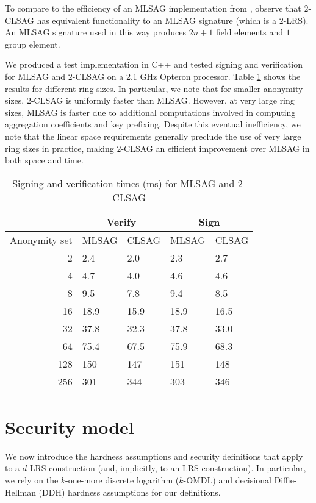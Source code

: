 \documentclass[draft]{llncs} %
\begin{document}
To compare to the efficiency of an MLSAG implementation from \cite{noether}, observe that $2$-CLSAG has equivalent functionality to an MLSAG signature (which is a $2$-LRS). An MLSAG signature used in this way produces $2n+1$ field elements and $1$ group element.

We produced a test implementation in C++ and tested signing and verification for MLSAG and $2$-CLSAG on a 2.1 GHz Opteron processor. Table \ref{table:timing} shows the results for different ring sizes. In particular, we note that for smaller anonymity sizes, $2$-CLSAG is uniformly faster than MLSAG. However, at very large ring sizes, MLSAG is faster due to additional computations involved in computing aggregation coefficients and key prefixing. Despite this eventual inefficiency, we note that the linear space requirements generally preclude the use of very large ring sizes in practice, making $2$-CLSAG an efficient improvement over MLSAG in both space and time.

\begin{table}[htp]
\begin{center}
\begin{tabular}{r|ll|ll}
& \multicolumn{2}{c|}{Verify} & \multicolumn{2}{c}{Sign} \\
\hline
Anonymity set & MLSAG & CLSAG & MLSAG & CLSAG \\
\hline
2 & 2.4 & 2.0 & 2.3 & 2.7 \\
4 & 4.7 & 4.0 & 4.6 & 4.6 \\
8 & 9.5 & 7.8 & 9.4 & 8.5 \\
16 & 18.9 & 15.9 & 18.9 & 16.5 \\
32 & 37.8 & 32.3 & 37.8 & 33.0 \\
64 & 75.4 & 67.5 & 75.9 & 68.3 \\
128 & 150 & 147 & 151 & 148 \\
256 & 301 & 344 & 303 & 346
\end{tabular}
\end{center}
\caption{Signing and verification times (ms) for MLSAG and $2$-CLSAG}
\label{table:timing}
\end{table}


\section{Security model}\label{sec:security}
We now introduce the hardness assumptions and security definitions that apply to a $d$-LRS construction (and, implicitly, to an LRS construction). In particular, we rely on the $k$-one-more discrete logarithm ($k$-OMDL) and decisional Diffie-Hellman (DDH) hardness assumptions for our definitions.
\end{document}

